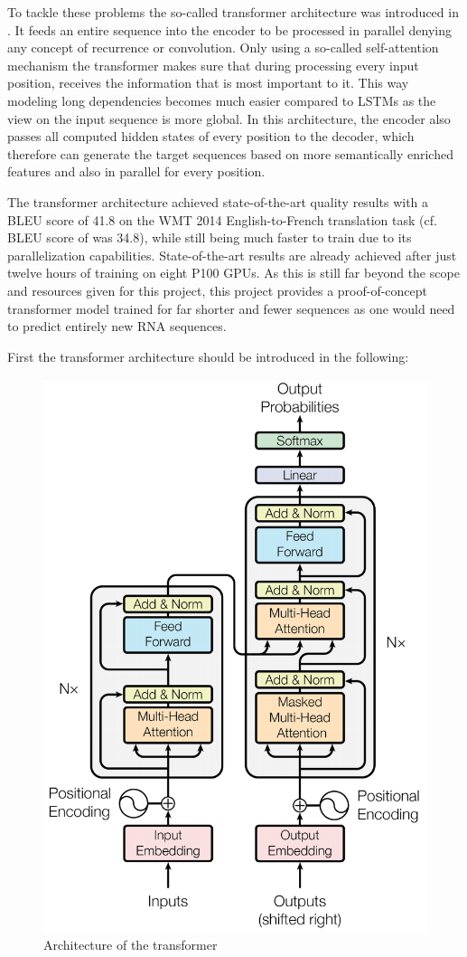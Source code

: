 To tackle these problems the so-called transformer architecture was in\-tro\-du\-ced in \cite{Vaswani2017}. It feeds an entire sequence into the encoder to be processed in parallel denying any concept of recurrence or convolution. Only using a so-called self-attention mechanism the transformer makes sure that during processing every input position, receives the information that is most important to it. This way modeling long dependencies becomes much easier compared to \acp{LSTM} as the view on the input sequence is more global. In this architecture, the encoder also passes all computed hidden states of every position to the decoder, which therefore can generate the target sequences based on more semantically enriched features and also in parallel for every position. \cite{Vaswani2017}

The transformer architecture achieved state-of-the-art quality results with a \ac{BLEU} score of 41.8 on the WMT 2014 English-to-French translation task (cf. \ac{BLEU} score of \cite{Sutskever2014} was 34.8), while still being much faster to train due to its parallelization capabilities. State-of-the-art results are already achieved after just twelve hours of training on eight P100 \acp{GPU}. As this is still far beyond the scope and resources given for this project, this project provides a proof-of-concept transformer model trained for far shorter and fewer sequences as one would need to predict entirely new \ac{RNA} sequences. \cite{Vaswani2017}

First the transformer architecture should be introduced in the following:

\begin{figure}[ht]
	\centering
	\includegraphics[width=0.5\linewidth]{figures/transformer.png}
	\caption{Architecture of the transformer \cite{Vaswani2017}}
	\label{transformer}
\end{figure}

